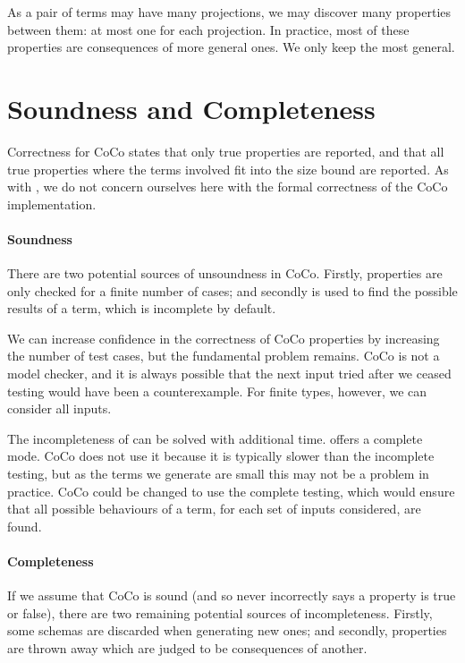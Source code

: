 As a pair of terms may have many projections, we may discover many
properties between them: at most one for each projection.  In
practice, most of these properties are consequences of more general
ones.  We only keep the most general.

\section{Soundness and Completeness}
\label{sec:coco-correctness}

Correctness for CoCo states that only true properties are reported,
and that all true properties where the terms involved fit into the
size bound are reported.  As with \dejafu{}, we do not concern
ourselves here with the formal correctness of the CoCo implementation.

\paragraph{Soundness}
There are two potential sources of unsoundness in CoCo.  Firstly,
properties are only checked for a finite number of cases; and secondly
\dejafu{} is used to find the possible results of a term, which is
incomplete by default.

We can increase confidence in the correctness of CoCo properties by
increasing the number of test cases, but the fundamental problem
remains.  CoCo is not a model checker, and it is always possible that
the next input tried after we ceased testing would have been a
counterexample.  For finite types, however, we can consider all
inputs.

The incompleteness of \dejafu{} can be solved with additional time.
\dejafu{} offers a complete mode.  CoCo does not use it because it is
typically slower than the incomplete testing, but as the terms we
generate are small this may not be a problem in practice.  CoCo could
be changed to use the complete testing, which would ensure that all
possible behaviours of a term, for each set of inputs considered, are
found.

\paragraph{Completeness}
If we assume that CoCo is sound (and so never incorrectly says a
property is true or false), there are two remaining potential sources
of incompleteness.  Firstly, some schemas are discarded when
generating new ones; and secondly, properties are thrown away which
are judged to be consequences of another.

